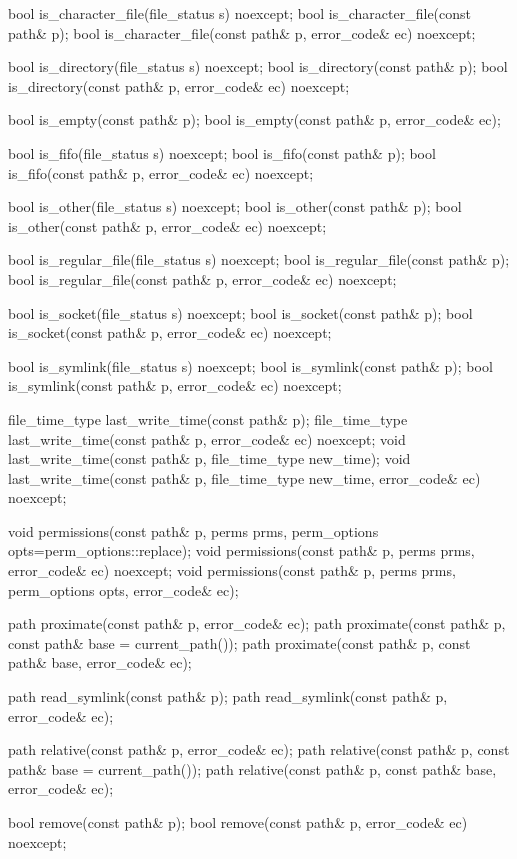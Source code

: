 \begin{codeblock}
{  bool is_character_file(file_status s) noexcept;
  bool is_character_file(const path& p);
  bool is_character_file(const path& p, error_code& ec) noexcept;

  bool is_directory(file_status s) noexcept;
  bool is_directory(const path& p);
  bool is_directory(const path& p, error_code& ec) noexcept;

  bool is_empty(const path& p);
  bool is_empty(const path& p, error_code& ec);

  bool is_fifo(file_status s) noexcept;
  bool is_fifo(const path& p);
  bool is_fifo(const path& p, error_code& ec) noexcept;

  bool is_other(file_status s) noexcept;
  bool is_other(const path& p);
  bool is_other(const path& p, error_code& ec) noexcept;

  bool is_regular_file(file_status s) noexcept;
  bool is_regular_file(const path& p);
  bool is_regular_file(const path& p, error_code& ec) noexcept;

  bool is_socket(file_status s) noexcept;
  bool is_socket(const path& p);
  bool is_socket(const path& p, error_code& ec) noexcept;

  bool is_symlink(file_status s) noexcept;
  bool is_symlink(const path& p);
  bool is_symlink(const path& p, error_code& ec) noexcept;

  file_time_type last_write_time(const path& p);
  file_time_type last_write_time(const path& p, error_code& ec) noexcept;
  void last_write_time(const path& p, file_time_type new_time);
  void last_write_time(const path& p, file_time_type new_time,
                       error_code& ec) noexcept;

  void permissions(const path& p, perms prms, perm_options opts=perm_options::replace);
  void permissions(const path& p, perms prms, error_code& ec) noexcept;
  void permissions(const path& p, perms prms, perm_options opts, error_code& ec);

  path proximate(const path& p, error_code& ec);
  path proximate(const path& p, const path& base = current_path());
  path proximate(const path& p, const path& base, error_code& ec);

  path read_symlink(const path& p);
  path read_symlink(const path& p, error_code& ec);

  path relative(const path& p, error_code& ec);
  path relative(const path& p, const path& base = current_path());
  path relative(const path& p, const path& base, error_code& ec);

  bool remove(const path& p);
  bool remove(const path& p, error_code& ec) noexcept;

}
\end{codeblock}
